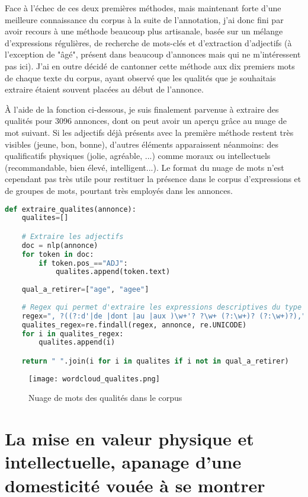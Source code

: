 {Face à l'échec de ces deux premières méthodes, mais maintenant forte d'une meilleure connaissance du corpus à la suite de l'annotation, j'ai donc fini par avoir recours à une méthode beaucoup plus artisanale, basée sur un mélange d'expressions régulières, de recherche de mots-clés et d'extraction d'adjectifs (à l'exception de "âgé", présent dans beaucoup d'annonces mais qui ne m'intéressent pas ici). J'ai en outre décidé de cantonner cette méthode aux dix premiers mots de chaque texte du corpus, ayant observé que les qualités que je souhaitais extraire étaient souvent placées au début de l'annonce. 

À l'aide de la fonction ci-dessous, je suis finalement parvenue à extraire des qualités pour 3096 annonces, dont on peut avoir un aperçu grâce au nuage de mot suivant. Si les adjectifs déjà présents avec la première méthode restent très visibles (jeune, bon, bonne), d'autres éléments apparaissent néanmoins: des qualificatifs physiques (jolie, agréable, ...) comme moraux ou intellectuels (recommandable, bien élevé, intelligent...). Le format du nuage de mots n'est cependant pas très utile pour restituer la présence dans le corpus d'expressions et de groupes de mots, pourtant très employés dans les annonces.

\begin{lstlisting}[language=Python,caption=Fonction destinée à extraire les qualités des annonces]
def extraire_qualites(annonce):
	qualites=[]

	# Extraire les adjectifs
	doc = nlp(annonce) 
	for token in doc:
		if token.pos_=="ADJ":
			qualites.append(token.text)
	
	qual_a_retirer=["age", "agee"]
	
	# Regex qui permet d'extraire les expressions descriptives du type "d'un beau physique", "aux moeurs honnetes"
	regex=", ?((?:d'|de |dont |au |aux )\w+'? ?\w+ (?:\w+)? (?:\w+)?),"
	qualites_regex=re.findall(regex, annonce, re.UNICODE)
	for i in qualites_regex:
		qualites.append(i)

	return " ".join(i for i in qualites if i not in qual_a_retirer)
\end{lstlisting}


\begin{figure}[ht]
	\centering
	\texttt{[image: wordcloud\_qualites.png]}
	\caption{Nuage de mots des qualités dans le corpus}
\end{figure}


\section{La mise en valeur physique et intellectuelle, apanage d'une domesticité vouée à se montrer}

}

